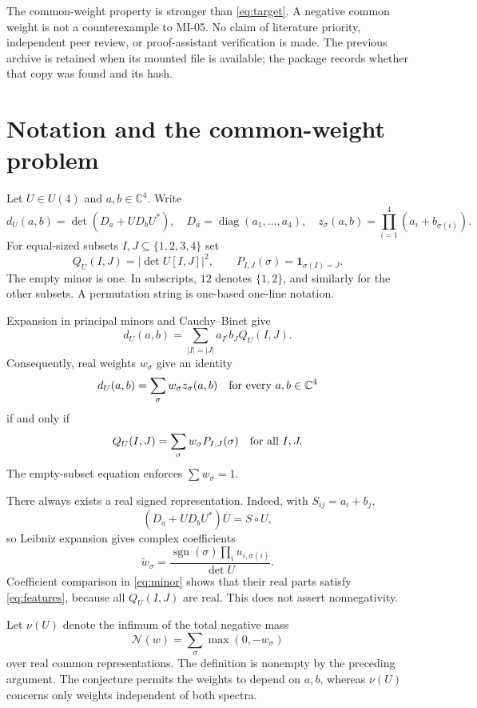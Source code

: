 \documentclass[11pt,a4paper]{article}
\newcommand{\C}{\mathbb C}
\newcommand{\diag}{\operatorname{diag}}
\newcommand{\sgn}{\operatorname{sgn}}
\begin{document}
The common-weight property is stronger than \eqref{eq:target}. A negative common weight is not a counterexample to MI-05. No claim of literature priority, independent peer review, or proof-assistant verification is made. The previous archive is retained when its mounted file is available; the package records whether that copy was found and its hash.

\tableofcontents
\newpage
\section{Notation and the common-weight problem}
Let $U\in U(4)$ and $a,b\in\C^4$. Write
\[
d_U(a,b)=\det(D_a+UD_bU^*),\quad D_a=\diag(a_1,\ldots,a_4),\quad
z_\sigma(a,b)=\prod_{i=1}^4(a_i+b_{\sigma(i)}).
\]
For equal-sized subsets $I,J\subseteq\{1,2,3,4\}$ set
\[
Q_U(I,J)=|\det U[I,J]|^2,\qquad
P_{I,J}(\sigma)=\mathbf1_{\sigma(I)=J}.
\]
The empty minor is one. In subscripts, $12$ denotes $\{1,2\}$, and similarly for the other subsets. A permutation string is one-based one-line notation.

Expansion in principal minors and Cauchy--Binet give
\begin{equation}\label{eq:minor}
d_U(a,b)=\sum_{|I|=|J|}a_{I^c}b_JQ_U(I,J).
\end{equation}
Consequently, real weights $w_\sigma$ give an identity
\begin{equation}\label{eq:common}
d_U(a,b)=\sum_\sigma w_\sigma z_\sigma(a,b)\quad\hbox{for every }a,b\in\C^4
\end{equation}
if and only if
\begin{equation}\label{eq:features}
Q_U(I,J)=\sum_\sigma w_\sigma P_{I,J}(\sigma)\quad\hbox{for all }I,J.
\end{equation}
The empty-subset equation enforces $\sum w_\sigma=1$.

There always exists a real signed representation. Indeed, with $S_{ij}=a_i+b_j$,
\[
(D_a+UD_bU^*)U=S\circ U,
\]
so Leibniz expansion gives complex coefficients
\[
\widetilde w_\sigma=\frac{\sgn(\sigma)\prod_i u_{i,\sigma(i)}}{\det U}.
\]
Coefficient comparison in \eqref{eq:minor} shows that their real parts satisfy \eqref{eq:features}, because all $Q_U(I,J)$ are real. This does not assert nonnegativity.

Let $\nu(U)$ denote the infimum of the total negative mass
\[
\mathcal N(w)=\sum_\sigma\max(0,-w_\sigma)
\]
over real common representations. The definition is nonempty by the preceding argument. The conjecture permits the weights to depend on $a,b$, whereas $\nu(U)$ concerns only weights independent of both spectra.
\end{document}
